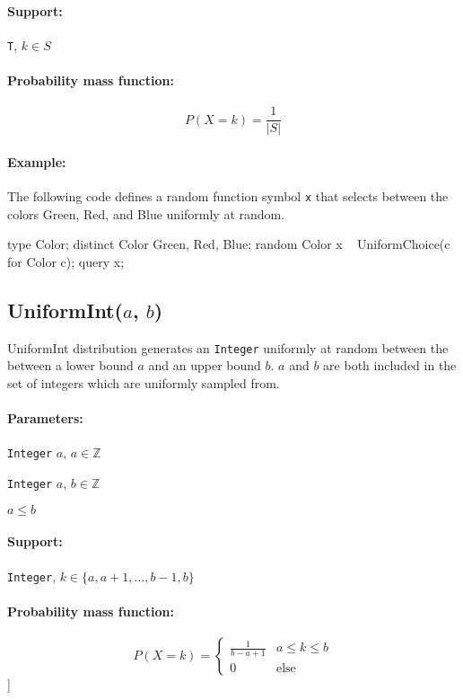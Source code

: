 \paragraph*{Support:} \verb|T|, $k \in S$ 

\paragraph*{Probability mass function:}
\[
	P(X = k) = \frac{1}{|S|}
\]

\paragraph*{Example:}
The following code defines a random function symbol \verb|x| that selects between the colors Green, Red, and Blue uniformly at random.

\begin{blogcode}
type Color;
distinct Color Green, Red, Blue;
random Color x ~ UniformChoice({c for Color c});
query x;
\end{blogcode}

\subsection{UniformInt($a$, $b$)}
UniformInt distribution generates an \verb|Integer| uniformly at random between the between a lower bound $a$ and an upper bound $b$. $a$ and $b$ are both included in the set of integers which are uniformly sampled from.

\paragraph*{Parameters:} 
\begin{itemize*}
\item[] \verb|Integer| $a$, $a \in \mathbb{Z}$
\item[] \verb|Integer| $a$, $b \in \mathbb{Z}$
\item[] $a \leq b$
 
\end{itemize*}

\paragraph*{Support:} \verb|Integer|, $k \in \{a, a+1, \ldots, b-1, b \}$ 

\paragraph*{Probability mass function:}
\[
	P(X = k) = \left\{
		  \begin{array}{lr}
		    \frac{1}{b - a + 1} & a \leq k \leq b \\
		    0 					& \text{else}
		  \end{array}
		\right.
\]]

